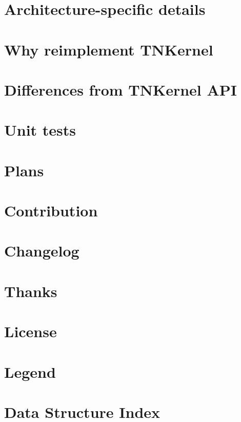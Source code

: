 \documentclass[twoside]{book}
\newcommand{\+}{\discretionary{\mbox{\scriptsize$\hookleftarrow$}}{}{}}
\begin{document}
\chapter{Architecture-\/specific details}
\label{arch_specific}

\chapter{Why reimplement T\+N\+Kernel}
\label{why_reimplement}

\chapter{Differences from T\+N\+Kernel A\+PI}
\label{tnkernel_diff}

\chapter{Unit tests}
\label{unit_tests}

\chapter{Plans}
\label{plans}

\chapter{Contribution}
\label{contribution}

\chapter{Changelog}
\label{changelog}

\chapter{Thanks}
\label{thanks}

\chapter{License}
\label{license}

\chapter{Legend}
\label{legend}

\chapter{Data Structure Index}

\end{document}
